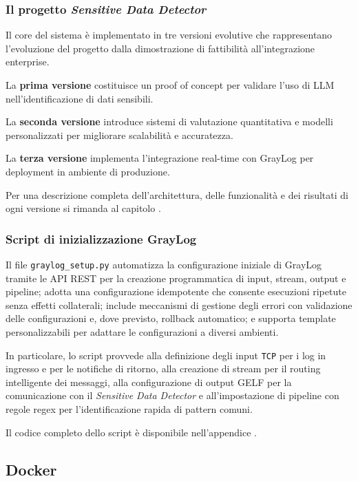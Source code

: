\documentclass[12pt]{report}
\begin{document}
\subsubsection{Il progetto \textit{Sensitive Data Detector}}
Il core del sistema è implementato in tre versioni evolutive che rappresentano l'evoluzione del progetto dalla dimostrazione di fattibilità all'integrazione enterprise.

La \textbf{prima versione} costituisce un proof of concept per validare l'uso di LLM nell'identificazione di dati sensibili.

La \textbf{seconda versione} introduce sistemi di valutazione quantitativa e modelli personalizzati per migliorare scalabilità e accuratezza.

La \textbf{terza versione} implementa l'integrazione real-time con GrayLog per deployment in ambiente di produzione.

Per una descrizione completa dell'architettura, delle funzionalità e dei risultati di ogni versione si rimanda al capitolo .

\subsubsection{Script di inizializzazione GrayLog}
Il file \texttt{graylog\_setup.py} automatizza la configurazione iniziale di GrayLog tramite le API REST per la creazione programmatica di input, stream, output e pipeline; adotta una configurazione idempotente che consente esecuzioni ripetute senza effetti collaterali; include meccanismi di gestione degli errori con validazione delle configurazioni e, dove previsto, rollback automatico; e supporta template personalizzabili per adattare le configurazioni a diversi ambienti.

In particolare, lo script provvede alla definizione degli input \texttt{TCP} per i log in ingresso e per le notifiche di ritorno, alla creazione di stream per il routing intelligente dei messaggi, alla configurazione di output GELF per la comunicazione con il \textit{Sensitive Data Detector} e all'impostazione di pipeline con regole regex per l'identificazione rapida di pattern comuni.

Il codice completo dello script è disponibile nell'appendice .

\subsection{Docker}
\label{subsec:docker}
\end{document}
